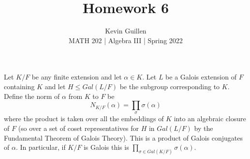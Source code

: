 \documentclass[11pt]{article}
\newenvironment{problem}[2][Problem\!]{\begin{tcolorbox}\begin{trivlist}
\item[\hskip \labelsep {\bfseries #1}\hskip \labelsep {\bfseries #2}]}{\end{trivlist}\end{tcolorbox}}
\renewcommand{\leq}{\leqslant}
\begin{document}
 
\title{Homework 6}
\author{Kevin Guillen\\[0.5em]
MATH 202 | Algebra III | Spring 2022}
\date{} 
\maketitle


\begin{problem}{14.2.17}
    Let $K/F$ be any finite extension and let $\alpha \in K$. Let $L$ be a Galois extension of $F$ containing $K$ and let $H \leq Gal(L/F)$ be the subgroup corresponding to $K$. Define the norm of $\alpha$ from $K$ to $F$ be
    \[N_{K/F}(\alpha) = \prod_{\sigma}\sigma(\alpha)\]
    where the product is taken over all the embeddings of $K$ into an algebraic closure of $F$ (so over a set of coset representatives for $H$ in $Gal(L/F)$ by the Fundamental Theorem of Galois Theory). This is a product of Galois conjugates of $\alpha$. In particular, if $K/F$ is Galois this is $\prod_{\sigma \in Gal(K/F)}\sigma(\alpha)$. 
\end{problem}
\end{document}
